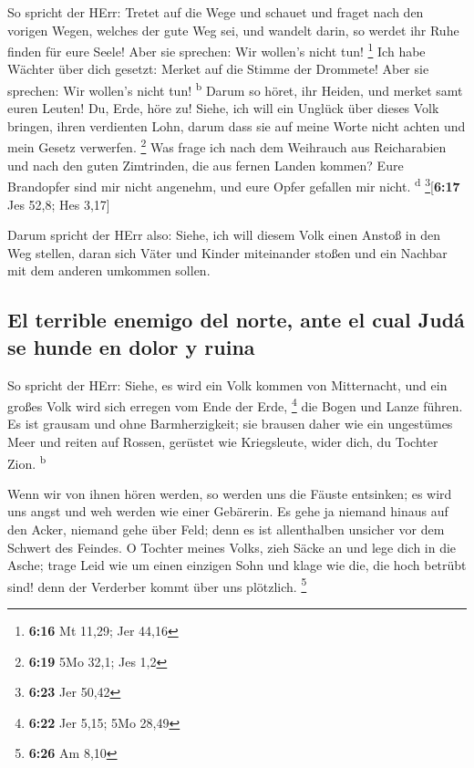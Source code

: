  So spricht der HErr: Tretet auf die Wege und schauet und
fraget nach den vorigen Wegen, welches der gute Weg sei, und wandelt
darin, so werdet ihr Ruhe finden für eure Seele! Aber sie sprechen: Wir
wollen's nicht tun! \footnote{\textbf{6:16} Mt 11,29; Jer 44,16}
 Ich habe Wächter über dich gesetzt: Merket auf die
Stimme der Drommete! Aber sie sprechen: Wir wollen's nicht tun!
\textsuperscript{b}  Darum so höret, ihr Heiden, und
merket samt euren Leuten!  Du, Erde, höre zu! Siehe, ich
will ein Unglück über dieses Volk bringen, ihren verdienten Lohn, darum
dass sie auf meine Worte nicht achten und mein Gesetz verwerfen.
\footnote{\textbf{6:19} 5Mo 32,1; Jes 1,2}  Was frage ich
nach dem Weihrauch aus Reicharabien und nach den guten Zimtrinden, die
aus fernen Landen kommen? Eure Brandopfer sind mir nicht angenehm, und
eure Opfer gefallen mir nicht. \textsuperscript{d}
\footnote{\textbf{6:23} Jer 50,42}{[}\textbf{6:17} Jes 52,8; Hes 3,17{]}

 Darum spricht der HErr also: Siehe, ich will diesem Volk
einen Anstoß in den Weg stellen, daran sich Väter und Kinder miteinander
stoßen und ein Nachbar mit dem anderen umkommen sollen.

\hypertarget{el-terrible-enemigo-del-norte-ante-el-cual-juduxe1-se-hunde-en-dolor-y-ruina}{%
\subsection{El terrible enemigo del norte, ante el cual Judá se hunde en
dolor y
ruina}\label{el-terrible-enemigo-del-norte-ante-el-cual-juduxe1-se-hunde-en-dolor-y-ruina}}

 So spricht der HErr: Siehe, es wird ein Volk kommen von
Mitternacht, und ein großes Volk wird sich erregen vom Ende der Erde,
\footnote{\textbf{6:22} Jer 5,15; 5Mo 28,49}  die Bogen
und Lanze führen. Es ist grausam und ohne Barmherzigkeit; sie brausen
daher wie ein ungestümes Meer und reiten auf Rossen, gerüstet wie
Kriegsleute, wider dich, du Tochter Zion. \textsuperscript{b}

 Wenn wir von ihnen hören werden, so werden uns die
Fäuste entsinken; es wird uns angst und weh werden wie einer Gebärerin.
 Es gehe ja niemand hinaus auf den Acker, niemand gehe
über Feld; denn es ist allenthalben unsicher vor dem Schwert des
Feindes.  O Tochter meines Volks, zieh Säcke an und lege
dich in die Asche; trage Leid wie um einen einzigen Sohn und klage wie
die, die hoch betrübt sind! denn der Verderber kommt über uns plötzlich.
\footnote{\textbf{6:26} Am 8,10}

